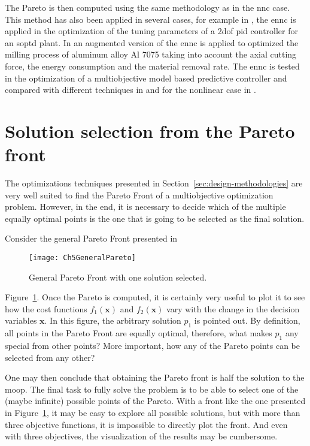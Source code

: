 The Pareto is then computed using the same methodology as in the \gls{nnc} case. This method has also been applied in several cases, for example in \citet{Contreras-Leiva2016}, the \gls{ennc} is applied in the optimization of the tuning parameters of a \gls{2dof} \gls{pid} controller for an \gls{soptd} plant. In\citet{Pereira2017b} an augmented version of the \gls{ennc} is applied to optimized the milling process of aluminum alloy Al 7075 taking into account the axial cutting force, the energy consumption and the material removal rate. The \gls{ennc} is tested in the optimization of a multiobjective model based predictive controller and compared with different techniques in \citet{Toro2011} and for the nonlinear case in \citet{Vallerio2014}.
\section{Solution selection from the Pareto front}
\label{sec:Selection}
The optimizations techniques presented in Section~\ref{sec:design-methodologies} are very well suited to find the Pareto Front of a multiobjective optimization problem. However, in the end, it is necessary to decide which of the multiple equally optimal points is the one that is going to be selected as the final solution.

Consider the general Pareto Front presented in 
\begin{figure}[b]
	\centering
	\texttt{[image: Ch5GeneralPareto]}
	\caption{General Pareto Front with one solution selected.}
	\label{fig:Ch5GeneralPareto}
\end{figure}
%
Figure~\ref{fig:Ch5GeneralPareto}. Once the Pareto is computed, it is certainly very useful to plot it to see how the cost functions $f_1(\mathbf{x})$ and $f_2(\mathbf{x})$ vary with the change in the decision variables $\mathbf{x}$. In this figure, the arbitrary solution $p_1$ is pointed out. By definition, all points in the Pareto Front are equally optimal, therefore, what makes $p_1$ any special from other points? More important, how any of the Pareto points can be selected from any other?

One may then conclude that obtaining the Pareto front is half the solution to the \gls{moop}. The final task to fully solve the problem is to be able to select one of the (maybe infinite) possible points of the Pareto. With a front like the one presented in Figure~\ref{fig:Ch5GeneralPareto}, it may be easy to explore all possible solutions, but with more than three objective functions, it is impossible to directly plot the front. And even with three objectives, the visualization of the results may be cumbersome.

